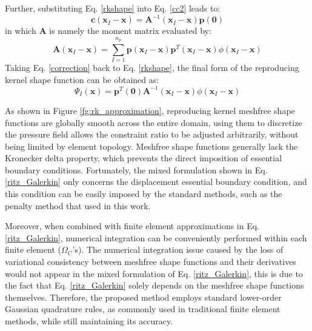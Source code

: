Further, substituting Eq. \ref{rkshape} into Eq. \eqref{cc2} leads to:
\begin{equation}\label{correction}
\boldsymbol{c}(\boldsymbol{x}_I-\boldsymbol{x}) = \boldsymbol{A}^{-1}(\boldsymbol{x}_I-\boldsymbol{x}) \boldsymbol{p}(\boldsymbol{0})
\end{equation}
in which $\boldsymbol{A}$ is namely the moment matrix evaluated by:
\begin{equation}
\boldsymbol{A}(\boldsymbol{x}_I-\boldsymbol{x}) = \sum_{I=1}^{n_p} \boldsymbol{p}(\boldsymbol{x}_I-\boldsymbol{x}) \boldsymbol{p}^T(\boldsymbol{x}_I-\boldsymbol{x}) \phi(\boldsymbol{x}_I-\boldsymbol{x})
\end{equation}
Taking Eq. \eqref{correction} back to Eq. \eqref{rkshape}, the final form of the reproducing kernel shape function can be obtained as:
\begin{equation}
\Psi_I(\boldsymbol{x}) = \boldsymbol{p}^T(\boldsymbol{0}) \boldsymbol{A}^{-1}(\boldsymbol{x}_I-\boldsymbol{x}) \phi(\boldsymbol{x}_I-\boldsymbol{x})
\end{equation}

As shown in Figure \ref{fg:rk_approximation},
reproducing kernel meshfree shape functions are globally smooth across the entire domain,
using them to discretize the pressure field allows the constraint ratio to be adjusted arbitrarily, without being limited by element topology.
Meshfree shape functions generally lack the Kronecker delta property, which prevents the direct imposition of essential boundary conditions.
Fortunately, the mixed formulation shown in Eq. \ref{ritz_Galerkin} only concerns the displacement essential boundary condition, and this condition can be easily imposed by the standard methods, such as the penalty method that used in this work.

Moreover,
when combined with finite element approximations in Eq. \ref{ritz_Galerkin},
numerical integration can be conveniently performed within each finite element ($\Omega_C$'s).
The numerical integration issue caused by the loss of variational consistency between meshfree shape functions and their derivatives \cite{wu2021} would not appear in the mixed formulation of Eq. \ref{ritz_Galerkin}, this is due to the fact that Eq. \ref{ritz_Galerkin} solely depends on the meshfree shape functions themselves.
Therefore, the proposed method employs standard lower-order Gaussian quadrature rules,
as commonly used in traditional finite element methods,
while still maintaining its accuracy.
\DIFaddbegin {}

